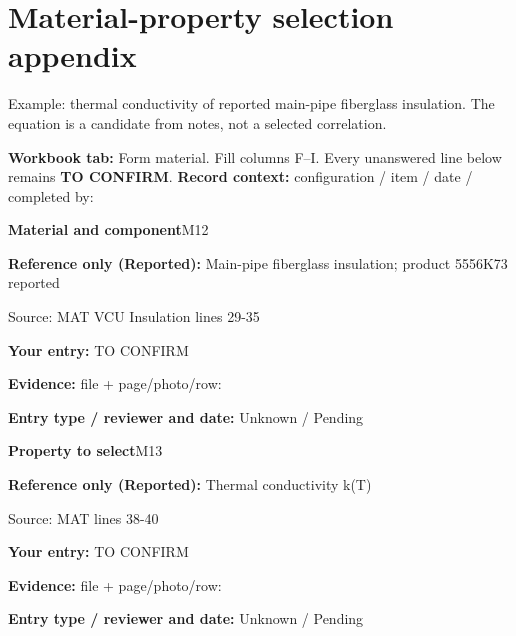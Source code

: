 \documentclass[11pt]{article}
\begin{document}
\clearpage\section{Material-property selection appendix}\label{form-material}
Example: thermal conductivity of reported main-pipe fiberglass insulation. The equation is a candidate from notes, not a selected correlation.
\par\textbf{Workbook tab:} Form material. Fill columns F--I. Every unanswered line below remains \textbf{TO CONFIRM}.
\textbf{Record context:} configuration / item / date / completed by: \hrulefill\par
\par\noindent\begin{minipage}{\textwidth}\small
{\color{navy}\bfseries Material and component}\hfill M12\par
\colorbox{pale}{\parbox{\dimexpr\linewidth-2\fboxsep\relax}{
\textbf{Reference only (Reported):} Main-pipe fiberglass insulation; product 5556K73 reported\par
{\footnotesize Source: MAT VCU Insulation lines 29-35}}}\par
\textbf{Your entry:} {\color{muted}TO CONFIRM}\enspace\hrulefill\par
{\footnotesize\textbf{Evidence:} file + page/photo/row: \hrulefill\par
\textbf{Entry type / reviewer and date:} Unknown / Pending\par
}\end{minipage}\par\vspace{5pt}
\par\noindent\begin{minipage}{\textwidth}\small
{\color{navy}\bfseries Property to select}\hfill M13\par
\colorbox{pale}{\parbox{\dimexpr\linewidth-2\fboxsep\relax}{
\textbf{Reference only (Reported):} Thermal conductivity k(T)\par
{\footnotesize Source: MAT lines 38-40}}}\par
\textbf{Your entry:} {\color{muted}TO CONFIRM}\enspace\hrulefill\par
{\footnotesize\textbf{Evidence:} file + page/photo/row: \hrulefill\par
\textbf{Entry type / reviewer and date:} Unknown / Pending\par
}\end{minipage}\par\vspace{5pt}
\end{document}

